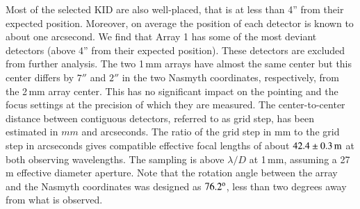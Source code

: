 Most of the selected KID are also well-placed, that is at less than 4'' from
their expected position. Moreover, on average the position of each
detector is known to about one arcsecond. We find
that Array 1 has some of the most deviant detectors (above 4''
from their expected position). These detectors are excluded from
further analysis. The two 1\,mm arrays have almost
the same center but this center differs by $7''$ and $2''$ in the two Nasmyth
coordinates, respectively, from the 2\,mm array center.
This has no significant impact on the pointing and the focus settings
at the precision of which they are measured.
{\lp The center-to-center distance between
contiguous detectors, referred to as grid step, has been estimated in
$mm$ and arcseconds. The ratio of the grid step in mm to
the grid step in arcseconds gives compatible effective focal lengths
of about $42.4\pm0.3\,\rm{m}$ at both observing wavelengths.} The sampling is above $\lambda/D$ at
1\,mm, assuming a 27\,m effective diameter aperture. Note that
the rotation angle between the array and the Nasmyth
coordinates was designed as $76.2^{\rm{o}}$, less than two degrees
away from what is observed.


